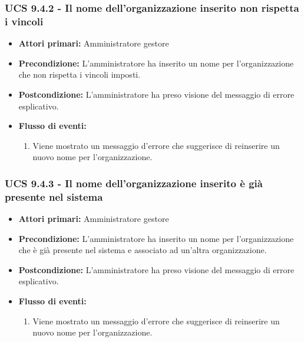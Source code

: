 \subsubsection{UCS 9.4.2 - Il nome dell'organizzazione inserito non rispetta i vincoli}%
\begin{itemize}
\item \textbf{Attori primari:} Amministratore gestore
\item \textbf{Precondizione:} L'amministratore ha inserito un nome per l'organizzazione che non rispetta i vincoli imposti.
\item \textbf{Postcondizione:} L'amministratore ha preso visione del messaggio di errore esplicativo.
\item \textbf{Flusso di eventi:}
    \begin{enumerate}
    \item Viene mostrato un messaggio d'errore che suggerisce di reinserire un nuovo nome per l'organizzazione.
    \end{enumerate} 
\end{itemize}

\subsubsection{UCS 9.4.3 - Il nome dell'organizzazione inserito è già presente nel sistema}%
\begin{itemize}
\item \textbf{Attori primari:} Amministratore gestore
\item \textbf{Precondizione:} L'amministratore ha inserito un nome per l'organizzazione che è già presente nel sistema e associato ad un'altra organizzazione.
\item \textbf{Postcondizione:} L'amministratore ha preso visione del messaggio di errore esplicativo.
\item \textbf{Flusso di eventi:}
    \begin{enumerate}
    \item Viene mostrato un messaggio d'errore che suggerisce di reinserire un nuovo nome per l'organizzazione.
    \end{enumerate} 
\end{itemize}

